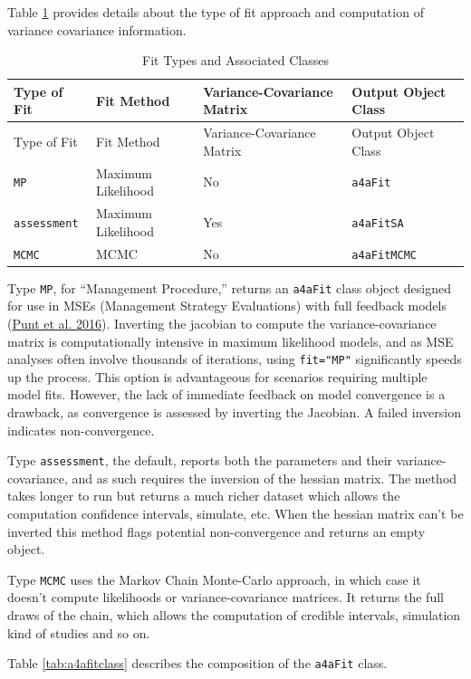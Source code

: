 \documentclass[
]{book}
\begin{document}
Table \ref{tab:scatype} provides details about the type of fit approach and computation of variance covariance information.

\begin{longtable}[]{@{}llll@{}}
\caption{\label{tab:scatype} Fit Types and Associated Classes}\tabularnewline
\toprule\noalign{}
Type of Fit & Fit Method & Variance-Covariance Matrix & Output Object Class \\
\midrule\noalign{}
\endfirsthead
\toprule\noalign{}
Type of Fit & Fit Method & Variance-Covariance Matrix & Output Object Class \\
\midrule\noalign{}
\endhead
\bottomrule\noalign{}
\endlastfoot
\texttt{MP} & Maximum Likelihood & No & \texttt{a4aFit} \\
\texttt{assessment} & Maximum Likelihood & Yes & \texttt{a4aFitSA} \\
\texttt{MCMC} & MCMC & No & \texttt{a4aFitMCMC} \\
\end{longtable}

Type \texttt{MP}, for ``Management Procedure,'' returns an \texttt{a4aFit} class object designed for use in MSEs (Management Strategy Evaluations) with full feedback models (\protect\hyperlink{ref-puntmse}{Punt et al. 2016}). Inverting the jacobian to compute the variance-covariance matrix is computationally intensive in maximum likelihood models, and as MSE analyses often involve thousands of iterations, using \texttt{fit="MP"} significantly speeds up the process. This option is advantageous for scenarios requiring multiple model fits. However, the lack of immediate feedback on model convergence is a drawback, as convergence is assessed by inverting the Jacobian. A failed inversion indicates non-convergence.

Type \texttt{assessment}, the default, reports both the parameters and their variance-covariance, and as such requires the inversion of the hessian matrix. The method takes longer to run but returns a much richer dataset which allows the computation confidence intervals, simulate, etc. When the hessian matrix can't be inverted this method flags potential non-convergence and returns an empty object.

Type \texttt{MCMC} uses the Markov Chain Monte-Carlo approach, in which case it doesn't compute likelihoods or variance-covariance matrices. It returns the full draws of the chain, which allows the computation of credible intervals, simulation kind of studies and so on.

Table \ref{tab:a4afitclass} describes the composition of the \texttt{a4aFit} class.
\end{document}
